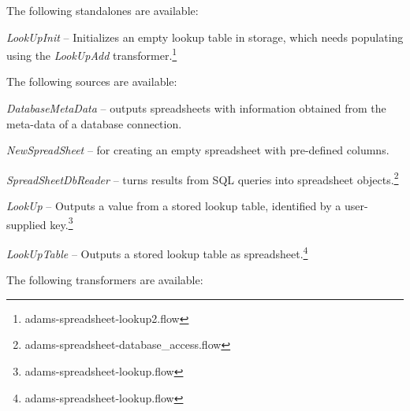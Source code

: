 \documentclass[a4paper]{book}
\begin{document}
The following standalones are available:
\begin{tight_itemize}
	\item \textit{LookUpInit} -- Initializes an empty lookup table in
	storage, which needs populating using the \textit{LookUpAdd}
	transformer.\footnote{adams-spreadsheet-lookup2.flow}
\end{tight_itemize}
The following sources are available:
\begin{tight_itemize}
	\item \textit{DatabaseMetaData} -- outputs spreadsheets with information
	obtained from the meta-data of a database connection.
	\item \textit{NewSpreadSheet} -- for creating an empty spreadsheet with
	pre-defined columns.
	\item \textit{SpreadSheetDbReader} -- turns results from SQL queries into
	spreadsheet objects.\footnote{adams-spreadsheet-database\_access.flow}
	\item \textit{LookUp} -- Outputs a value from a stored lookup table,
	identified by a user-supplied key.\footnote{adams-spreadsheet-lookup.flow}
	\item \textit{LookUpTable} -- Outputs a stored lookup table as
	spreadsheet.\footnote{adams-spreadsheet-lookup.flow}
\end{tight_itemize}
The following transformers are available:
\end{document}
